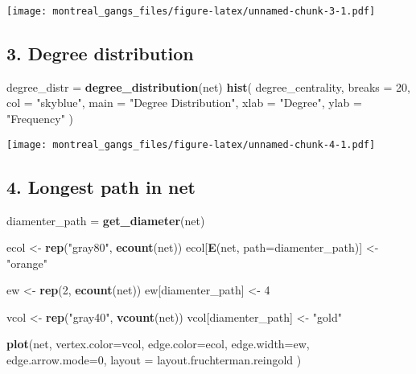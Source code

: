 \documentclass[
]{article}
\newenvironment{Shaded}{\begin{snugshade}}{\end{snugshade}}
\newcommand{\AttributeTok}[1]{\textcolor[rgb]{0.13,0.29,0.53}{#1}}
\newcommand{\DecValTok}[1]{\textcolor[rgb]{0.00,0.00,0.81}{#1}}
\newcommand{\FunctionTok}[1]{\textcolor[rgb]{0.13,0.29,0.53}{\textbf{#1}}}
\newcommand{\NormalTok}[1]{#1}
\newcommand{\OtherTok}[1]{\textcolor[rgb]{0.56,0.35,0.01}{#1}}
\newcommand{\StringTok}[1]{\textcolor[rgb]{0.31,0.60,0.02}{#1}}
\begin{document}
\texttt{[image: montreal\_gangs\_files/figure-latex/unnamed-chunk-3-1.pdf]}

\hypertarget{degree-distribution}{%
\subsection{3. Degree distribution}\label{degree-distribution}}

\begin{Shaded}
\begin{Highlighting}[]
\NormalTok{degree\_distr }\OtherTok{=} \FunctionTok{degree\_distribution}\NormalTok{(net)}
\FunctionTok{hist}\NormalTok{(}
\NormalTok{  degree\_centrality, }
  \AttributeTok{breaks =} \DecValTok{20}\NormalTok{, }
  \AttributeTok{col =} \StringTok{"skyblue"}\NormalTok{, }
  \AttributeTok{main =} \StringTok{"Degree Distribution"}\NormalTok{, }
  \AttributeTok{xlab =} \StringTok{"Degree"}\NormalTok{, }
  \AttributeTok{ylab =} \StringTok{"Frequency"}
\NormalTok{)}
\end{Highlighting}
\end{Shaded}

\texttt{[image: montreal\_gangs\_files/figure-latex/unnamed-chunk-4-1.pdf]}

\hypertarget{longest-path-in-net}{%
\subsection{4. Longest path in net}\label{longest-path-in-net}}

\begin{Shaded}
\begin{Highlighting}[]
\NormalTok{diamenter\_path }\OtherTok{=} \FunctionTok{get\_diameter}\NormalTok{(net)}

\NormalTok{ecol }\OtherTok{\textless{}{-}} \FunctionTok{rep}\NormalTok{(}\StringTok{"gray80"}\NormalTok{, }\FunctionTok{ecount}\NormalTok{(net))}
\NormalTok{ecol[}\FunctionTok{E}\NormalTok{(net, }\AttributeTok{path=}\NormalTok{diamenter\_path)] }\OtherTok{\textless{}{-}} \StringTok{"orange"} 

\NormalTok{ew }\OtherTok{\textless{}{-}} \FunctionTok{rep}\NormalTok{(}\DecValTok{2}\NormalTok{, }\FunctionTok{ecount}\NormalTok{(net))}
\NormalTok{ew[diamenter\_path] }\OtherTok{\textless{}{-}} \DecValTok{4}

\NormalTok{vcol }\OtherTok{\textless{}{-}} \FunctionTok{rep}\NormalTok{(}\StringTok{"gray40"}\NormalTok{, }\FunctionTok{vcount}\NormalTok{(net))}
\NormalTok{vcol[diamenter\_path] }\OtherTok{\textless{}{-}} \StringTok{"gold"}

\FunctionTok{plot}\NormalTok{(net, }
   \AttributeTok{vertex.color=}\NormalTok{vcol, }
   \AttributeTok{edge.color=}\NormalTok{ecol, }
   \AttributeTok{edge.width=}\NormalTok{ew, }
   \AttributeTok{edge.arrow.mode=}\DecValTok{0}\NormalTok{,}
   \AttributeTok{layout =}\NormalTok{ layout.fruchterman.reingold}
\NormalTok{)}
\end{Highlighting}
\end{Shaded}
\end{document}
